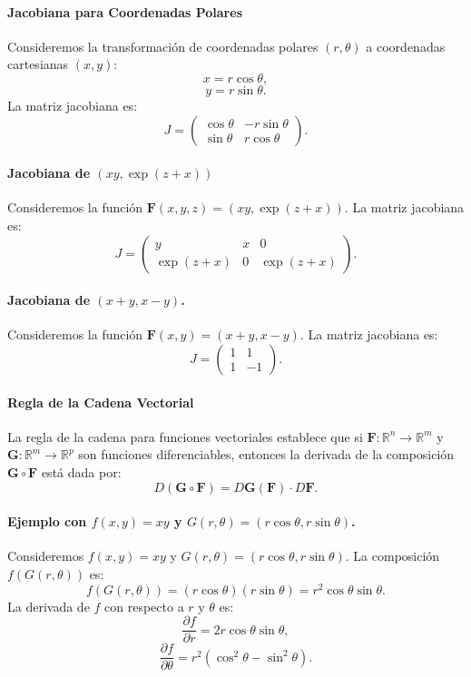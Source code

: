 \documentclass[11pt]{book}
\theoremstyle{definicion}
\theoremstyle{teorema}
\theoremstyle{ejemplo}
\begin{document}
\paragraph{Jacobiana para Coordenadas Polares}
Consideremos la transformación de coordenadas polares \( (r, \theta) \) a coordenadas cartesianas \( (x, y) \):
\[ x = r \cos \theta, \]
\[ y = r \sin \theta. \]
La matriz jacobiana es:
\[ J = \begin{pmatrix} \cos \theta & -r \sin \theta \\ \sin \theta & r \cos \theta \end{pmatrix}. \]

\paragraph{Jacobiana de \( (xy, \exp(z + x)) \)}
Consideremos la función \( \mathbf{F}(x, y, z) = (xy, \exp(z + x)) \). La matriz jacobiana es:
\[ J = \begin{pmatrix} y & x & 0 \\ \exp(z + x) & 0 & \exp(z + x) \end{pmatrix}. \]

\paragraph{Jacobiana de \( (x + y, x - y) \).}
Consideremos la función \( \mathbf{F}(x, y) = (x + y, x - y) \). La matriz jacobiana es:
\[ J = \begin{pmatrix} 1 & 1 \\ 1 & -1 \end{pmatrix}. \]

\paragraph{Regla de la Cadena Vectorial}
La regla de la cadena para funciones vectoriales establece que si \( \mathbf{F}: \mathbb{R}^n \to \mathbb{R}^m \) y \( \mathbf{G}: \mathbb{R}^m \to \mathbb{R}^p \) son funciones diferenciables, entonces la derivada de la composición \( \mathbf{G} \circ \mathbf{F} \) está dada por:
\[ D(\mathbf{G} \circ \mathbf{F}) = D\mathbf{G}(\mathbf{F}) \cdot D\mathbf{F}. \]

\paragraph{Ejemplo con \( f(x, y) = xy \) y \( G(r, \theta) = (r \cos \theta, r \sin \theta) \).}
Consideremos \( f(x, y) = xy \) y \( G(r, \theta) = (r \cos \theta, r \sin \theta) \). La composición \( f(G(r, \theta)) \) es:
\[ f(G(r, \theta)) = (r \cos \theta)(r \sin \theta) = r^2 \cos \theta \sin \theta. \]
La derivada de \( f \) con respecto a \( r \) y \( \theta \) es:
\[ \frac{\partial f}{\partial r} = 2r \cos \theta \sin \theta, \]
\[ \frac{\partial f}{\partial \theta} = r^2 (\cos^2 \theta - \sin^2 \theta). \]
\end{document}
